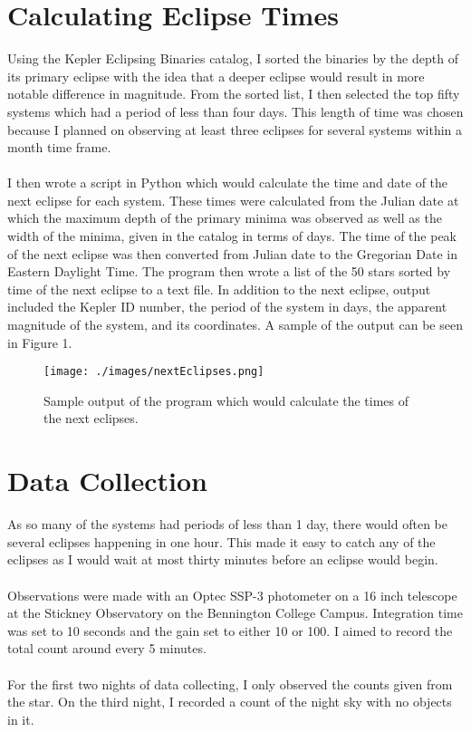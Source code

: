 \documentclass[12pt]{article}
\begin{document}
	\section{Calculating Eclipse Times}
	
	Using the Kepler Eclipsing Binaries catalog, I sorted the binaries by the depth of its primary eclipse with the idea that a deeper eclipse would result in more notable difference in magnitude. From the sorted list, I then selected the top fifty systems which had a period of less than four days. This length of time was chosen because I planned on observing at least three eclipses for several systems within a month time frame. 
	\\\\
	I then wrote a script in Python which would calculate the time and date of the next eclipse for each system. These times were calculated from the Julian date at which the maximum depth of the primary minima was observed as well as the width of the minima, given in the catalog in terms of days. The time of the peak of the next eclipse was then converted from Julian date to the Gregorian Date in Eastern Daylight Time. The program then wrote a list of the 50 stars sorted by time of the next eclipse to a text file. In addition to the next eclipse, output included the Kepler ID number, the period of the system in days, the apparent magnitude of the system, and its coordinates. A sample of the output can be seen in Figure 1.
	\begin{figure}
		\texttt{[image: ./images/nextEclipses.png]}
		\caption{Sample output of the program which would calculate the times of the next eclipses.}
	\end{figure}
	
	\section{Data Collection}
	
	As so many of the systems had periods of less than 1 day, there would often be several eclipses happening in one hour. This made it easy to catch any of the eclipses as I would wait at most thirty minutes before an eclipse would begin. 
	\\\\
	Observations were made with an Optec SSP-3 photometer on a 16 inch telescope at the Stickney Observatory on the Bennington College Campus. Integration time was set to 10 seconds and the gain set to either 10 or 100. I aimed to record the total count around every 5 minutes.
	\\\\
	For the first two nights of data collecting, I only observed the counts given from the star. On the third night, I recorded a count of the night sky with no objects in it.
	
\end{document}
